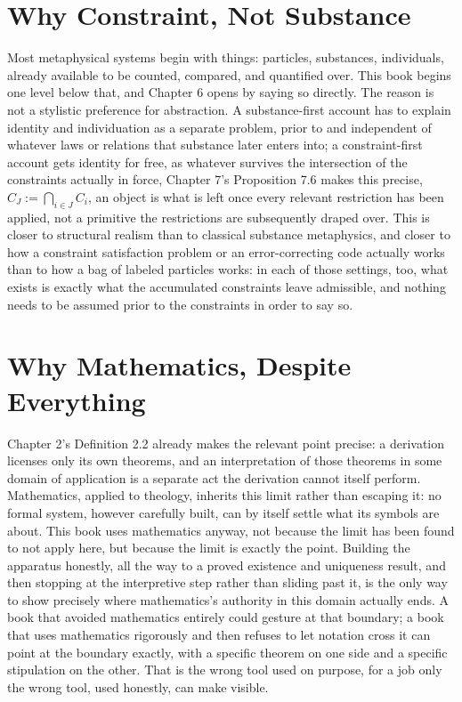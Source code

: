 \documentclass[11pt]{book}
\begin{document}
\section*{Why Constraint, Not Substance}

Most metaphysical systems begin with things: particles, substances, individuals, already available to be counted, compared, and quantified over. This book begins one level below that, and Chapter 6 opens by saying so directly. The reason is not a stylistic preference for abstraction. A substance-first account has to explain identity and individuation as a separate problem, prior to and independent of whatever laws or relations that substance later enters into; a constraint-first account gets identity for free, as whatever survives the intersection of the constraints actually in force, Chapter 7's Proposition 7.6 makes this precise, $C_J := \bigcap_{i \in J} C_i$, an object is what is left once every relevant restriction has been applied, not a primitive the restrictions are subsequently draped over. This is closer to structural realism than to classical substance metaphysics, and closer to how a constraint satisfaction problem or an error-correcting code actually works than to how a bag of labeled particles works: in each of those settings, too, what exists is exactly what the accumulated constraints leave admissible, and nothing needs to be assumed prior to the constraints in order to say so.

\section*{Why Mathematics, Despite Everything}

Chapter 2's Definition 2.2 already makes the relevant point precise: a derivation licenses only its own theorems, and an interpretation of those theorems in some domain of application is a separate act the derivation cannot itself perform. Mathematics, applied to theology, inherits this limit rather than escaping it: no formal system, however carefully built, can by itself settle what its symbols are about. This book uses mathematics anyway, not because the limit has been found to not apply here, but because the limit is exactly the point. Building the apparatus honestly, all the way to a proved existence and uniqueness result, and then stopping at the interpretive step rather than sliding past it, is the only way to show precisely where mathematics's authority in this domain actually ends. A book that avoided mathematics entirely could gesture at that boundary; a book that uses mathematics rigorously and then refuses to let notation cross it can point at the boundary exactly, with a specific theorem on one side and a specific stipulation on the other. That is the wrong tool used on purpose, for a job only the wrong tool, used honestly, can make visible.
\end{document}
